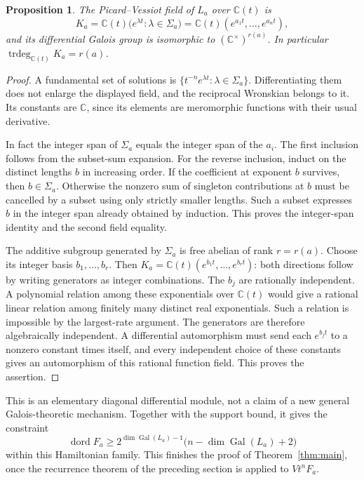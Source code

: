 \documentclass[11pt]{article}
\newtheorem{proposition}[theorem]{Proposition}
\theoremstyle{definition}
\theoremstyle{remark}
\newcommand{\C}{\mathbb C}
\numberwithin{equation}{section}
\begin{document}
\begin{proposition}\label{prop:torus}
The Picard--Vessiot field of $L_a$ over $\C(t)$ is
\[
 K_a=\C(t)\bigl(e^{\lambda t}:\lambda\in\Sigma_a\bigr)
     =\C(t)(e^{a_1t},\ldots,e^{a_nt}),
\]
and its differential Galois group is isomorphic to
$(\C^\times)^{r(a)}$. In particular
$\operatorname{trdeg}_{\C(t)}K_a=r(a)$.
\end{proposition}
\begin{proof}
A fundamental set of solutions is
$\{t^{-n}e^{\lambda t}:\lambda\in\Sigma_a\}$. Differentiating them
does not enlarge the displayed field, and the reciprocal Wronskian
belongs to it. Its constants are $\C$, since its elements are
meromorphic functions with their usual derivative.

In fact the integer span of $\Sigma_a$ equals the integer span of the
$a_i$. The first inclusion follows from the subset-sum expansion. For
the reverse inclusion, induct on the distinct lengths $b$ in increasing
order. If the coefficient at exponent $b$ survives, then $b\in\Sigma_a$.
Otherwise the nonzero sum of singleton contributions at $b$ must be
cancelled by a subset using only strictly smaller lengths. Such a subset
expresses $b$ in the integer span already obtained by induction. This
proves the integer-span identity and the second field equality.

The additive subgroup generated by $\Sigma_a$ is free abelian of rank
$r=r(a)$. Choose its integer basis $b_1,\ldots,b_r$. Then
$K_a=\C(t)(e^{b_1t},\ldots,e^{b_rt})$: both directions follow by
writing generators as integer combinations. The $b_j$ are rationally
independent. A polynomial relation among these exponentials over
$\C(t)$ would give a rational linear relation among finitely many
distinct real exponentials. Such a relation is impossible by the
largest-rate argument. The generators are therefore algebraically
independent. A differential automorphism must send each $e^{b_jt}$
to a nonzero constant times itself, and every independent choice of
these constants gives an automorphism of this rational function field.
This proves the assertion.
\end{proof}

This is an elementary diagonal differential module, not a claim of a
new general Galois-theoretic mechanism. Together with the support bound,
it gives the constraint
\[
 \operatorname{dord}F_a\ge
 2^{\dim\operatorname{Gal}(L_a)-1}
 \bigl(n-\dim\operatorname{Gal}(L_a)+2\bigr)
\]
within this Hamiltonian family. This finishes the proof of
Theorem~\ref{thm:main}, once the recurrence theorem of the preceding
section is applied to $Vt^nF_a$.
\end{document}

